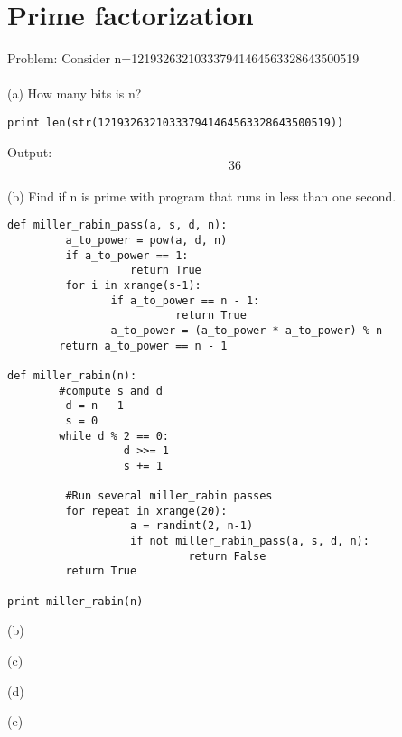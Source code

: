 \documentclass[12pt]{article}
\begin{document}
\section{Prime factorization}

Problem: Consider n=121932632103337941464563328643500519
\\\\(a) How many bits is n?
\begin{verbatim}
print len(str(121932632103337941464563328643500519))
\end{verbatim}
Output:  \[\boxed{36}\] 
\\(b) Find if n is prime with program that runs in less than one second.
\begin{verbatim}
def miller_rabin_pass(a, s, d, n):
         a_to_power = pow(a, d, n)
         if a_to_power == 1:
                   return True
         for i in xrange(s-1):
                if a_to_power == n - 1:
                          return True
                a_to_power = (a_to_power * a_to_power) % n
        return a_to_power == n - 1

def miller_rabin(n):
        #compute s and d
         d = n - 1
         s = 0
        while d % 2 == 0:
                  d >>= 1
                  s += 1

         #Run several miller_rabin passes
         for repeat in xrange(20):
                   a = randint(2, n-1)
                   if not miller_rabin_pass(a, s, d, n):
                            return False
         return True

print miller_rabin(n)
\end{verbatim}

(b)

(c)

(d)

(e)
\end{document}
